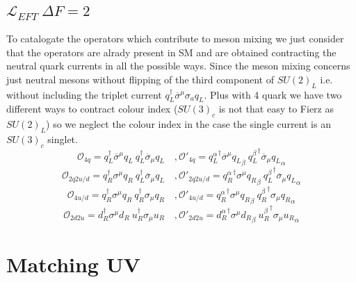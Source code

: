 \documentclass{article}
\begin{document}
\subsection{$\mathcal{L}_{EFT} \ \Delta F = 2$ }
To catalogate the operators which contribute to meson mixing we just consider that the operators are alrady present in SM and are obtained contracting the neutral quark currents in all the possible ways. Since the meson mixing concerns just neutral mesons without flipping of the third component of $SU(2)_L$ i.e. without including the triplet current $q^\dagger_L \overline{\sigma}^\mu  \sigma_a q_L$. Plus with 4 quark we have two different ways to contract colour index ($SU(3)_c$ is not that easy to Fierz as $SU(2)_L$) so we neglect the colour index in the case the single current is an $SU(3)_c$ singlet.
\[
\mathcal{O}_{4q} = q_L^\dagger \overline{\sigma}^\mu q_L \ q_L^\dagger \overline{\sigma}_\mu q_L \quad , \mathcal{O'}_{4q} = {q_L^\alpha}^\dagger \overline{\sigma}^\mu {q_L}_\beta \ {q_L^\beta}^\dagger \overline{\sigma}_\mu {q_L}_\alpha
\]
\[
\mathcal{O}_{2q2u/d} = q_R^\dagger \sigma^\mu q_R \ q_L^\dagger \overline{\sigma}_\mu q_L \quad , \mathcal{O'}_{2q2u/d} = {q_R^\alpha}^\dagger \sigma^\mu {q_R}_\beta \ {q_L^\beta}^\dagger \overline{\sigma}_\mu {q_L}_\alpha
\]
\[
\mathcal{O}_{4u/d} = q_R^\dagger \sigma^\mu q_R \ q_R^\dagger {\sigma}_\mu q_R \quad , \mathcal{O'}_{4u/d} = {q_R^\alpha}^\dagger \sigma^\mu {q_R}_\beta \ {q_R^\beta}^\dagger {\sigma}_\mu {q_R}_\alpha
\]
\[
\mathcal{O}_{2d2u} = d_R^\dagger \sigma^\mu d_R \ u_R^\dagger \sigma_\mu u_R \quad , \mathcal{O'}_{2d2u} = {d_R^\alpha}^\dagger \sigma^\mu {d_R}_\beta \ {u_R^\beta}^\dagger \sigma_\mu {u_R}_\alpha
\]
\section{Matching UV}
\end{document}
